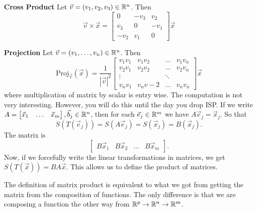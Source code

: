 \textbf{Cross Product} Let $\vec{v}=(v_1,v_2,v_3)\in\mathbb{R}^n$. Then \[
	\vec{v}\times\vec{x} = \begin{bmatrix}
		0 & -v_3 & v_2\\
		v_3 & 0 & -v_1\\
		-v_2 & v_1 & 0
	\end{bmatrix}\vec{x}
\]

\textbf{Projection} Let $\vec{v}=(v_1,\ldots,v_n)\in\mathbb{R}^n$. Then \[
	\textrm{Proj}_{\vec{v}}(\vec{x})=\frac{1}{|\vec{v}|^2}\begin{bmatrix}
		v_1 v_1 & v_1 v_2 & \ldots & v_1 v_n \\
		v_2 v_1 & v_2 v_2 & \ldots & v_2 v_n \\
		\vdots & & \ddots & \\
		v_n v_1 & v_n v-2 & \ldots & v_n v_n
	\end{bmatrix}\vec{x}
\]
where multiplication of matrix by scalar is entry wise.
The computation is not very interesting. However, you will do this until the day you drop ISP.
If we write $A=\begin{bmatrix}
	\vec{x}_1 & \ldots & \vec{x}_m
\end{bmatrix}, \vec{b}_j\in\mathbb{R}^n$, then for each $\vec{e}_j\in\mathbb{R}^m$ we have $A\vec{e}_j=\vec{x}_j$.
So that \[
S(T(\vec{e}_j))= S(A\vec{e}_j) = S(\vec{x}_j) = B(\vec{x}_j).
\]
The matrix is \[
\begin{bmatrix}
	B\vec{x}_1 & B\vec{x}_2 & \ldots & B\vec{x}_m
\end{bmatrix}.
\]
Now, if we forcefully write the linear transformations in matrices, we get $S(T(\vec{x}))= BA\vec{x}$. This allows us
to define the product of matrices.
\begin{remark}
	The definition of matrix product is equivalent to what we got from getting the matrix from the composition of functions.
	The only difference is that we are composing a function the other way from $\mathbb{R}^p\to\mathbb{R}^n\to\mathbb{R}^m$.
\end{remark}
